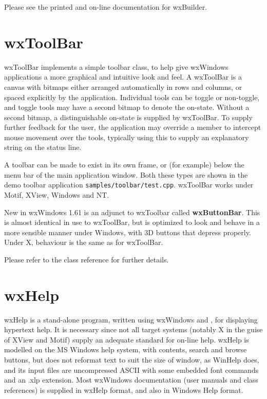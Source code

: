 Please see the printed and on-line documentation for wxBuilder.

\section{wxToolBar}\label{wxtoolbardescr}

wxToolBar implements a simple toolbar class, to help give wxWindows
applications a more graphical and intuitive look and feel. A wxToolBar
is a canvas with bitmaps either arranged automatically in rows and
columns, or spaced explicitly by the application. Individual tools can
be toggle or non-toggle, and toggle tools may have a second bitmap to
denote the on-state. Without a second bitmap, a distinguishable on-state
is supplied by wxToolBar. To supply further feedback for the user, the
application may override a member to intercept mouse movement over the
tools, typically using this to supply an explanatory string on the
status line.

A toolbar can be made to exist in its own frame, or (for example) below
the menu bar of the main application window. Both these types are shown
in the demo toolbar application {\tt samples/toolbar/test.cpp}. wxToolBar works under Motif,
XView, Windows and NT.

New in wxWindows 1.61 is an adjunct to wxToolbar called {\bf
wxButtonBar}. This is almost identical in use to wxToolBar, but is
optimized to look and behave in a more sensible manner under Windows,
with 3D buttons that depress properly. Under X, behaviour is the same as
for wxToolBar.

Please refer to the class reference for further details.

\section{wxHelp}\label{wxhelp}

wxHelp is a stand-alone program, written using wxWindows and ,
for displaying hypertext help. It is necessary since not all target
systems (notably X in the guise of XView and Motif) supply an adequate
standard for on-line help. wxHelp is modelled on the MS Windows help
system, with contents, search and browse buttons, but does not reformat
text to suit the size of window, as WinHelp does, and its input files
are uncompressed ASCII with some embedded font commands and an .xlp
extension. Most wxWindows documentation (user manuals and class
references) is supplied in wxHelp format, and also in Windows Help
format.

